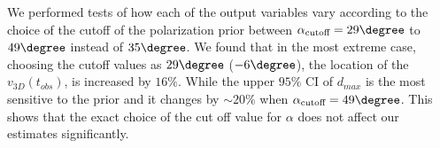 \label{sec: sensitivityTests}
We performed tests of how each of the output variables vary according to the
choice of the cutoff of the polarization prior between
$\alpha_{\text{cutoff}} =
29 \degree$ to $49\degree$ instead of $35 \degree$.  
We found that in the most extreme case, choosing the cutoff values as $29
\degree$ ($-6 \degree$), the location of the $v_{3D}(t_{obs})$, is
increased by $ 16 \%$. While the upper $95\%$ CI of $d_{max}$ is
the most sensitive to the prior and it changes by
$\sim 20 \%$ when $\alpha_{\text{cutoff}} = 49 \degree$. 
This shows that the exact choice of the cut off value for $\alpha$ does
not affect our estimates significantly.






